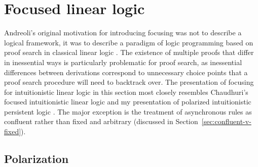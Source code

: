 \section{Focused linear logic}
\label{sec:foclinlog}

Andreoli's original motivation for introducing focusing was not to
describe a logical framework, it was to describe a paradigm of logic
programming based on proof search in classical linear logic
\cite{andreoli92logic}. The existence of multiple proofs that differ
in inessential ways is particularly problematic for proof search, as
inessential differences between derivations correspond to unnecessary
choice points that a proof search procedure will need to backtrack
over. The presentation of focusing for intuitionistic linear logic in
this section most closely resembles Chaudhuri's focused intuitionistic
linear logic \cite{chaudhuri06focused} and my presentation of
polarized intuitionistic persistent logic
\cite{simmons11structural}. The major exception is the treatment of
asynchronous rules as confluent rather than fixed and arbitrary
(discussed in Section~\ref{sec:confluent-v-fixed}).

\subsection{Polarization}
\label{sec:linpolar}

